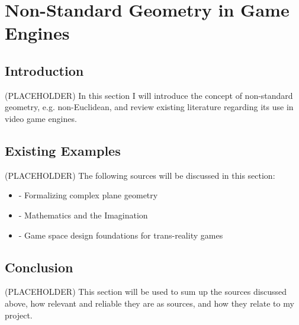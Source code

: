 \section{Non-Standard Geometry in Game Engines}
\label{lr:ne}

\begin{multicols*}{2}
	\subsection{Introduction}
	\label{lr:ne:intro}
		(PLACEHOLDER) In this section I will introduce the concept of non-standard geometry, e.g. non-Euclidean, and review existing literature regarding its use in video game engines.
	
	\subsection{Existing Examples}
	\label{lr:ne:existing}
		(PLACEHOLDER) The following sources will be discussed in this section:
		\begin{itemize}
			\item \cite{Maric2014} - Formalizing complex plane geometry
			\item \cite{Turner2009} - Mathematics and the Imagination
			\item \cite{Lindley2005} - Game space design foundations for trans-reality games
		\end{itemize}
		
	\subsection{Conclusion}
	\label{lr:ne:conclusion}
		(PLACEHOLDER) This section will be used to sum up the sources discussed above, how relevant and reliable they are as sources, and how they relate to my project.
		
\end{multicols*}